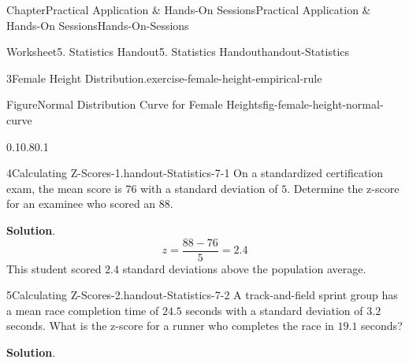 \documentclass[oneside,10pt,]{book}
\newcommand{\blocktitlefont}{\relax}
\begin{document}
\begin{chapterptx}{Chapter}{Practical Application \& Hands-On Sessions}{}{Practical Application \& Hands-On Sessions}{}{}{Hands-On-Sessions}
\begin{worksheet-section}{Worksheet}{5. Statistics Handout}{}{5. Statistics Handout}{}{}{handout-Statistics}
\begin{divisionexercise}{3}{Female Height Distribution.}{}{exercise-female-height-empirical-rule}
\begin{figureptx}{Figure}{Normal Distribution Curve for Female Heights}{fig-female-height-normal-curve}{}
\begin{image}{0.1}{0.8}{0.1}{}%
%
\end{image}%
\tcblower
\end{figureptx}%
\end{divisionexercise}%
\clearpage
\begin{divisionexercise}{4}{Calculating Z-Scores-1.}{}{handout-Statistics-7-1}%
On a standardized certification exam, the mean score is \(76\) with a standard deviation of \(5\). Determine the z-score for an examinee who scored an \(88\).%
\par\smallskip%
\noindent\textbf{\blocktitlefont Solution}.\hypertarget{handout-Statistics-7-1-3}{}\quad{}%
\begin{equation*}
z = \frac{88 - 76}{5} = 2.4
\end{equation*}
This student scored \(2.4\) standard deviations above the population average.%
\end{divisionexercise}%
\begin{divisionexercise}{5}{Calculating Z-Scores-2.}{}{handout-Statistics-7-2}%
A track-and-field sprint group has a mean race completion time of \(24.5\) seconds with a standard deviation of \(3.2\) seconds. What is the z-score for a runner who completes the race in \(19.1\) seconds?%
\par\smallskip%
\noindent\textbf{\blocktitlefont Solution}.\hypertarget{handout-Statistics-7-2-3}{}\quad{}%

\end{divisionexercise}
\end{worksheet-section}
\end{chapterptx}
\end{document}
